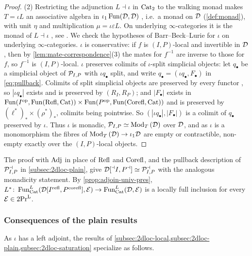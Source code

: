 \begin{proof}
(2) Restricting the adjunction $L \dashv \iota$ in $\mathrm{Cat}_{2}$ to the walking
monad \cite[Not.~5.1]{haugseng2021laxmonads} makes $T = \iota L$ an associative
algebra in
$\iota_{1}\operatorname{Fun}(\mathcal{D},\mathcal{D})$
\cite[Cor.~8.9]{haugseng2021laxmonads}, i.e.\ a monad on $\mathcal{D}$
(\cref{def:monad}), with unit $\eta$ and multiplication
$\mu = \iota\varepsilon L$.
On underlying $\infty$-categories it is the monad of $L \dashv \iota$
\cite[\S 4.7.3]{ha}, see \cite[\S 8]{haugseng2021laxmonads}.
We check the hypotheses of Barr--Beck--Lurie \cite[4.7.3.5]{ha} for $\iota$ on
underlying $\infty$-categories.
$\iota$ is conservative: if $f$ is $(I,P)$-local and invertible in $\mathcal{D}$,
then by \cref{lem:mate-correspondence}(3) the mates for $f^{-1}$ are inverse to
those for $f$, so $f^{-1}$ is $(I,P)$-local.
$\iota$ preserves colimits of $\iota$-split simplicial objects:
let $q_{\bullet}$ be a simplicial object of $\mathcal{P}_{I,P}$ with $\iota q_{\bullet}$
split, and write
$q_{\bullet} = (\iota q_{\bullet},F_{\bullet})$
in \eqref{eq:pullback}. Colimits of split simplicial objects are preserved by
every functor \cite[6.1.3.16]{htt}, so $|\iota q_{\bullet}|$ exists and is
preserved by $(R_{I},R_{P})$; and $|F_{\bullet}|$ exists in
$\operatorname{Fun}(I^{\mathrm{op}},\operatorname{Fun}(\mathrm{Refl},\mathrm{Cat})) \times \operatorname{Fun}(P^{\mathrm{op}},\operatorname{Fun}(\mathrm{Corefl},\mathrm{Cat}))$
and is preserved by
$(\ell^{*})_{*} \times (\rho^{*})_{*}$,
colimits being pointwise. So
$(|\iota q_{\bullet}|,|F_{\bullet}|)$
is a colimit of $q_{\bullet}$ preserved by $\iota$.
Thus $\iota$ is monadic,
$\mathcal{P}_{I,P} \simeq {\operatorname{Mod}_{T}\left(\mathcal{D}\right)}$
over $\mathcal{D}$, and as $\iota$ is a monomorphism the fibres of
${\operatorname{Mod}_{T}\left(\mathcal{D}\right)} \to \iota_{1}\mathcal{D}$
are empty or contractible, non-empty exactly over the $(I,P)$-local objects.
\end{proof}

%
The proof with $\mathrm{Adj}$ in place of $\mathrm{Refl}$ and $\mathrm{Corefl}$,
and the pullback description of $\mathcal{P}^{\dashv}_{I,P}$ in
\cref{subsec:2dloc-plain}, give
$\mathcal{D}[{}^{\dashv}{I},{P}^{\dashv}] \simeq \mathcal{P}^{\dashv}_{I,P}$
with the analogous monadicity statement.
By \cref{prop:adjoin-univ-pres},
$L^{*}\colon \operatorname{Fun}^{L}_{\mathrm{Cat}}(\mathcal{D}[{I}^{\mathrm{refl}},{P}^{\mathrm{corefl}}],\mathcal{E}) \to \operatorname{Fun}^{L}_{\mathrm{Cat}}(\mathcal{D},\mathcal{E})$
is a locally full inclusion for every $\mathcal{E} \in \operatorname{2Pr}^{\operatorname{L}}$.

\subsubsection*{Consequences of the plain results}
%
As $\iota$ has a left adjoint, the results of
\cref{subsec:2dloc-local,subsec:2dloc-plain,subsec:2dloc-saturation} specialize
as follows.

